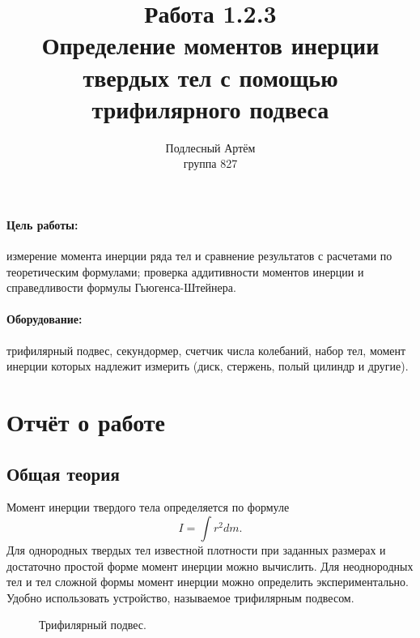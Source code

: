 \documentclass[a4paper, 12pt]{article}%
\author{Подлесный Артём \\ группа 827}
\title{Работа 1.2.3 \\ Определение моментов инерции твердых тел с помощью трифилярного подвеса}
\begin{document}
\maketitle
\paragraph{Цель работы:}
измерение момента инерции ряда тел и сравнение результатов с расчетами по теоретическим формулами; проверка аддитивности моментов инерции и справедливости формулы Гьюгенса-Штейнера.
\paragraph{Оборудование:}
трифилярный подвес, секундормер, счетчик числа колебаний, набор тел, момент инерции которых надлежит измерить (диск, стержень, полый цилиндр и другие).
\section{Отчёт о работе}
\subsection{Общая теория}
Момент инерции твердого тела определяется по формуле
\begin{equation}
I=\int r^2dm.
\end{equation}
Для однородных твердых тел известной плотности при заданных размерах и достаточно простой форме момент инерции можно вычислить. Для неоднородных тел и тел сложной формы момент инерции можно определить экспериментально. Удобно использовать устройство, называемое трифилярным подвесом.

\begin{figure}[h!]
\caption{Трифилярный подвес.}
\end{figure}
\end{document}
